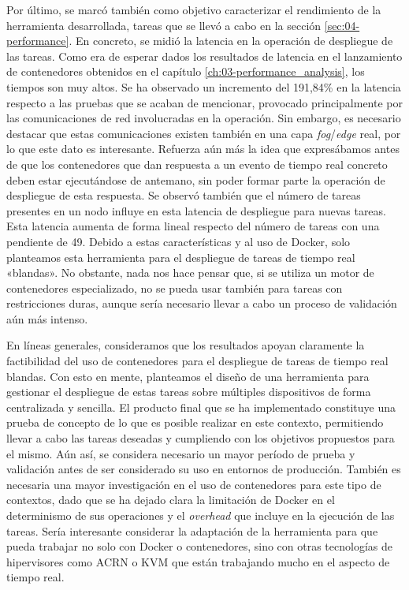 Por último, se marcó también como objetivo caracterizar el rendimiento de la
herramienta desarrollada, tareas que se llevó a cabo en la sección
\ref{sec:04-performance}. En concreto, se midió la latencia en la operación de
despliegue de las tareas. Como era de esperar dados los resultados de latencia
en el lanzamiento de contenedores obtenidos en el capítulo
\ref{ch:03-performance_analysis}, los tiempos son muy altos. Se ha observado un
incremento del 191,84\% en la latencia respecto a las pruebas que se acaban de
mencionar, provocado principalmente por las comunicaciones de red involucradas
en la operación. Sin embargo, es necesario destacar que estas comunicaciones
existen también en una capa \textit{fog}/\textit{edge} real, por lo que este
dato es interesante. Refuerza aún más la idea que expresábamos antes de que los
contenedores que dan respuesta a un evento de tiempo real concreto deben estar
ejecutándose de antemano, sin poder formar parte la operación de despliegue de
esta respuesta. Se observó también que el número de tareas presentes en un nodo
influye en esta latencia de despliegue para nuevas tareas. Esta latencia aumenta
de forma lineal respecto del número de tareas con una pendiente de 49. Debido a
estas características y al uso de Docker, solo planteamos esta herramienta para
el despliegue de tareas de tiempo real «blandas». No obstante, nada nos hace
pensar que, si se utiliza un motor de contenedores especializado, no se pueda
usar también para tareas con restricciones duras, aunque sería necesario llevar
a cabo un proceso de validación aún más intenso.

En líneas generales, consideramos que los resultados apoyan claramente la
factibilidad del uso de contenedores para el despliegue de tareas de tiempo real
blandas. Con esto en mente, planteamos el diseño de una herramienta para
gestionar el despliegue de estas tareas sobre múltiples dispositivos de forma
centralizada y sencilla. El producto final que se ha implementado constituye una
prueba de concepto de lo que es posible realizar en este contexto, permitiendo
llevar a cabo las tareas deseadas y cumpliendo con los objetivos propuestos para
el mismo. Aún así, se considera necesario un mayor período de prueba y
validación antes de ser considerado su uso en entornos de producción. También es
necesaria una mayor investigación en el uso de contenedores para este tipo de
contextos, dado que se ha dejado clara la limitación de Docker en el
determinismo de sus operaciones y el \textit{overhead} que incluye en la
ejecución de las tareas. Sería interesante considerar la adaptación de la
herramienta para que pueda trabajar no solo con Docker o contenedores, sino con
otras tecnologías de hipervisores como ACRN o KVM que están trabajando mucho en
el aspecto de tiempo real.

